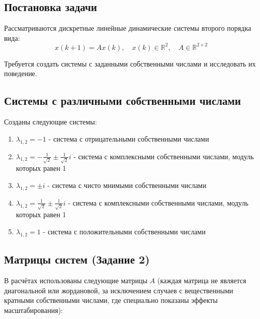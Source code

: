 \subsection*{Постановка задачи}

Рассматриваются дискретные линейные динамические системы второго порядка вида:
\begin{equation}
x(k + 1) = Ax(k), \quad x(k) \in \mathbb{R}^2, \quad A \in \mathbb{R}^{2 \times 2}
\end{equation}

Требуется создать системы с заданными собственными числами и исследовать их поведение.

\subsection*{Системы с различными собственными числами}

Созданы следующие системы:

\begin{enumerate}
    \item $\lambda_{1,2} = -1$ - система с отрицательными собственными числами
    \item $\lambda_{1,2} = -\frac{1}{\sqrt{2}} \pm \frac{1}{\sqrt{2}}i$ - система с комплексными собственными числами, модуль которых равен 1
    \item $\lambda_{1,2} = \pm i$ - система с чисто мнимыми собственными числами
    \item $\lambda_{1,2} = \frac{1}{\sqrt{2}} \pm \frac{1}{\sqrt{2}}i$ - система с комплексными собственными числами, модуль которых равен 1
    \item $\lambda_{1,2} = 1$ - система с положительными собственными числами
\end{enumerate}

\subsection*{Матрицы систем (Задание 2)}

В расчётах использованы следующие матрицы $A$ (каждая матрица не является диагональной или жордановой, за исключением случаев с вещественными кратными собственными числами, где специально показаны эффекты масштабирования):

